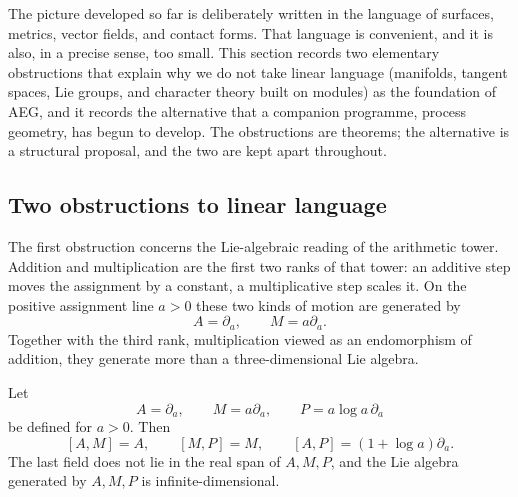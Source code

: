 The picture developed so far is deliberately written in the language of
surfaces, metrics, vector fields, and contact forms.  That language is
convenient, and it is also, in a precise sense, too small.  This section records
two elementary obstructions that explain why we do not take linear language
(manifolds, tangent spaces, Lie groups, and character theory built on modules)
as the foundation of AEG, and it records the alternative that a companion
programme, process geometry, has begun to develop.  The obstructions are
theorems; the alternative is a structural proposal, and the two are kept apart
throughout.

\subsection{Two obstructions to linear language}

The first obstruction concerns the Lie-algebraic reading of the arithmetic
tower.  Addition and multiplication are the first two ranks of that tower: an
additive step moves the assignment by a constant, a multiplicative step scales
it.  On the positive assignment line $a>0$ these two kinds of motion are
generated by
\[
  A=\partial_a,
  \qquad
  M=a\partial_a .
\]
Together with the third rank, multiplication viewed as an endomorphism of
addition, they generate more than a three-dimensional Lie algebra.

\begin{proposition}
\label{prop:p0-arithmetic-generators}
Let
\[
  A=\partial_a,
  \qquad
  M=a\partial_a,
  \qquad
  P=a\log a\,\partial_a
\]
be defined for $a>0$.  Then
\[
  [A,M]=A,
  \qquad
  [M,P]=M,
  \qquad
  [A,P]=(1+\log a)\partial_a .
\]
The last field does not lie in the real span of $A,M,P$, and the Lie algebra
generated by $A,M,P$ is infinite-dimensional.
\end{proposition}

